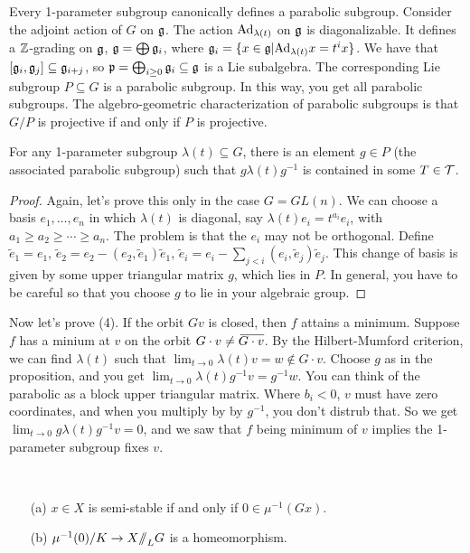 Every 1-parameter subgroup canonically defines a parabolic subgroup. Consider the adjoint action of $G$ on $\mathfrak{g}$. The action $\mathrm{Ad}_{\lambda(t)}$ on $\mathfrak{g}$ is diagonalizable. It defines a $\mathbb{Z}$-grading on $\mathfrak{g}$, $\mathfrak{g}=\bigoplus \mathfrak{g}_i$, where $\mathfrak{g}_i=\{x\in \mathfrak{g}|\mathrm{Ad}_{\lambda(t)}x=t^ix\}$. We have that $[\mathfrak{g}_i,\mathfrak{g}_j]\subseteq \mathfrak{g}_{i+j}$, so $\mathfrak{p}=\bigoplus_{i\ge 0}\mathfrak{g}_i\subseteq \mathfrak{g}$ is a Lie subalgebra. The corresponding Lie subgroup $P\subseteq G$ is a parabolic subgroup. In this way, you get all parabolic subgroups. The algebro-geometric characterization of parabolic subgroups is that $G/P$ is projective if and only if $P$ is projective.
\begin{proposition}
 For any 1-parameter subgroup $\lambda(t)\subseteq G$, there is an element $g\in P$ (the associated parabolic subgroup) such that $g\lambda(t)g^{-1}$ is contained in some $T\in \mathcal{T}$.
\end{proposition}
\begin{proof}
 Again, let's prove this only in the case $G=GL(n)$. We can choose a basis $e_1,\dots, e_n$ in which $\lambda(t)$ is diagonal, say $\lambda(t)e_i=t^{a_i}e_i$, with $a_1\ge a_2\ge \cdots\ge a_n$. The problem is that the $e_i$ may not be orthogonal. Define $\tilde e_1=e_1$, $\tilde e_2=e_2-(e_2,\tilde e_1)\tilde e_1$, $\tilde e_i = e_i - \sum_{j<i} (e_i,\tilde e_j)\tilde e_j$. This change of basis is given by some upper triangular matrix $g$, which lies in $P$. In general, you have to be careful so that you choose $g$ to lie in your algebraic group.
\end{proof}
Now let's prove (4). If the orbit $Gv$ is closed, then $f$ attains a minimum. Suppose $f$ has a minium at $v$ on the orbit $G\cdot v\neq \bbar{G\cdot v}$. By the Hilbert-Mumford criterion, we can find $\lambda(t)$ such that $\lim_{t\to 0} \lambda(t)v=w\not\in G\cdot v$. Choose $g$ as in the proposition, and you get $\lim_{t\to 0}\lambda(t) g^{-1}v=g^{-1}w$. You can think of the parabolic as a block upper triangular matrix. Where $b_i<0$, $v$ must have zero coordinates, and when you multiply by by $g^{-1}$, you don't distrub that. So we get $\lim_{t\to 0}g\lambda(t)g^{-1}v=0$, and we saw that $f$ being minimum of $v$ implies the 1-parameter subgroup fixes $v$.
\begin{theorem}
 {\ }
 \begin{enumerate}
  \item[(a)] $x\in X$ is semi-stable if and only if $0\in \mu^{-1}(Gx)$.
  \item[(b)] $\mu^{-1}(0)/K\to X\mbox{\rm /\!\!/}_L G$ is a homeomorphism.
 \end{enumerate}
\end{theorem}
